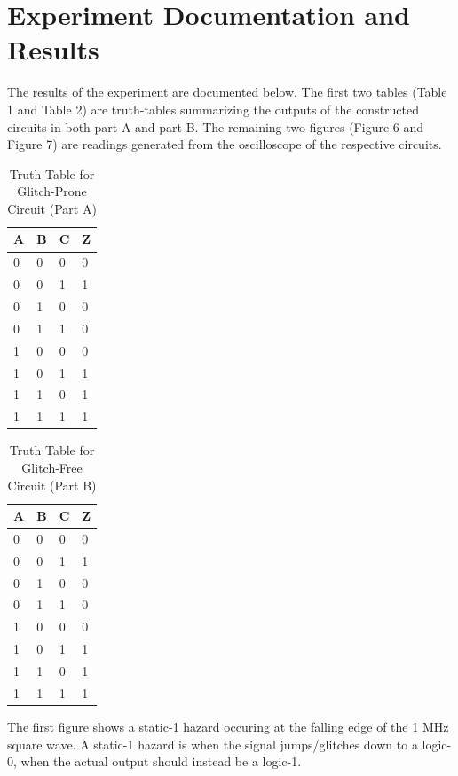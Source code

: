 \documentclass{scrartcl}
\begin{document}
\section{Experiment Documentation and Results}
The results of the experiment are documented below. The first two tables (Table 1 and Table 2) are truth-tables summarizing the outputs of the constructed circuits in both part A and part B. The remaining two figures (Figure 6 and Figure 7) are readings generated from the oscilloscope of the respective circuits. 
	\begin{table}[H]
		\centering
		\begin{tabular}{lll|l}
			A & B & C & Z \\ \hline
			0 & 0 & 0 & 0 \\
			0 & 0 & 1 & 1 \\
			0 & 1 & 0 & 0 \\
			0 & 1 & 1 & 0 \\
			1 & 0 & 0 & 0 \\
			1 & 0 & 1 & 1 \\
			1 & 1 & 0 & 1 \\
			1 & 1 & 1 & 1
		\end{tabular}
		\caption{Truth Table for Glitch-Prone Circuit (Part A)}
		\label{glitch-prone-truth-table}
	\end{table}

	\begin{table}[H]
		\centering
		\begin{tabular}{lll|l}
			A & B & C & Z \\ \hline
			0 & 0 & 0 & 0 \\
			0 & 0 & 1 & 1 \\
			0 & 1 & 0 & 0 \\
			0 & 1 & 1 & 0 \\
			1 & 0 & 0 & 0 \\
			1 & 0 & 1 & 1 \\
			1 & 1 & 0 & 1 \\
			1 & 1 & 1 & 1
		\end{tabular}
		\caption{Truth Table for Glitch-Free Circuit (Part B)}
		\label{glitch-free-truth-table}
	\end{table}

The first figure shows a static-1 hazard occuring at the falling edge of the 1 MHz square wave. A static-1 hazard is when the signal jumps/glitches down to a logic-0, when the actual output should instead be a logic-1. 
\end{document}
